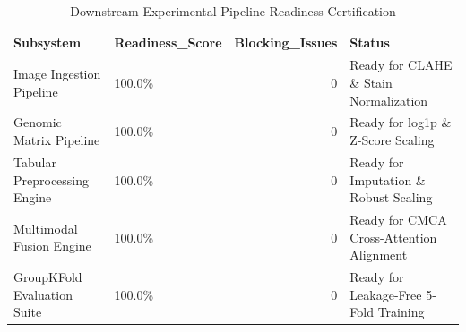 \begin{table}
\caption{Downstream Experimental Pipeline Readiness Certification}
\label{tab:table_readiness_certification}
\begin{tabular}{llrl}
\toprule
Subsystem & Readiness\_Score & Blocking\_Issues & Status \\
\midrule
Image Ingestion Pipeline & 100.0\% & 0 & Ready for CLAHE \& Stain Normalization \\
Genomic Matrix Pipeline & 100.0\% & 0 & Ready for log1p \& Z-Score Scaling \\
Tabular Preprocessing Engine & 100.0\% & 0 & Ready for Imputation \& Robust Scaling \\
Multimodal Fusion Engine & 100.0\% & 0 & Ready for CMCA Cross-Attention Alignment \\
GroupKFold Evaluation Suite & 100.0\% & 0 & Ready for Leakage-Free 5-Fold Training \\
\bottomrule
\end{tabular}
\end{table}
